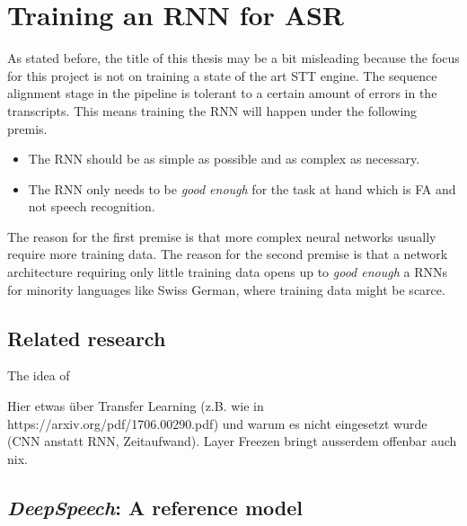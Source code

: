 \section{Training an \ac{RNN} for \ac{ASR}}\label{ds}
As stated before, the title of this thesis may be a bit misleading because the focus for this project is not on training a state of the art \ac{STT} engine. The sequence alignment stage in the pipeline is tolerant to a certain amount of errors in the transcripts. This means training the \ac{RNN} will happen under the following premis.

\begin{itemize}
	\item The \ac{RNN} should be as simple as possible and as complex as necessary.
	\item The \ac{RNN} only needs to be \textit{good enough} for the task at hand which is \ac{FA} and not speech recognition.	
\end{itemize}

The reason for the first premise is that more complex neural networks usually require more training data. The reason for the second premise is that a network architecture requiring only little training data opens up to \textit{good enough} a \ac{RNN}s for minority languages like Swiss German, where training data might be scarce.

\subsection{Related research}

The idea of \cite{budget} 

Hier etwas über Transfer Learning (z.B. wie in https://arxiv.org/pdf/1706.00290.pdf) und warum es nicht eingesetzt wurde (CNN anstatt RNN, Zeitaufwand). Layer Freezen bringt ausserdem offenbar auch nix. \parencite{budget}

\subsection{\textit{DeepSpeech}: A reference model}

